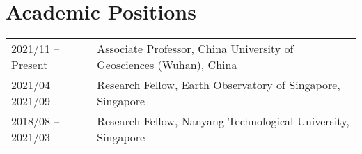 \section*{Academic Positions}
\begin{tabular}{p{} p{}}
2021/11 -- Present & Associate Professor, China University of Geosciences (Wuhan), China \\
2021/04 -- 2021/09 & Research Fellow, Earth Observatory of Singapore, Singapore \\
2018/08 -- 2021/03 & Research Fellow, Nanyang Technological University, Singapore \\
\end{tabular}
